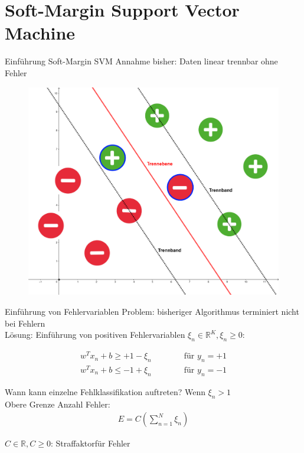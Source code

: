 \documentclass[ngerman]{beamer}
\begin{document}
\section{Soft-Margin Support Vector Machine}

\begin{frame}{Einführung Soft-Margin SVM}
	Annahme bisher: Daten linear trennbar ohne Fehler \\
	
	\begin{center}
		\begin{figure}
			\includegraphics[width=\textwidth,height=0.7\textheight,keepaspectratio]{assets/soft_margin_example.png}
		\end{figure}
	\end{center}
\end{frame}

\begin{frame}{Einführung von Fehlervariablen}
	Problem: bisheriger Algorithmus terminiert nicht bei Fehlern \\
	Lösung: Einführung von positiven Fehlervariablen $\xi_{n} \in \mathbb{R}^{K}, \xi_{n} \geq 0$:
	
	\begin{subequations}
		\begin{alignat*}{2}
			w^{T} x_{n} + b \geq +1 - \xi_{n}& \qquad & \text{ für } y_{n} = +1\\
			w^{T} x_{n} + b \leq -1 + \xi_{n}& & \text{ für } y_{n} = -1
		\end{alignat*}
	\end{subequations}

	Wann kann einzelne Fehlklassifikation auftreten? Wenn $\xi_{n} > 1$ \\
	
	Obere Grenze Anzahl Fehler:
	\begin{equation*}
		\begin{aligned}
			E = C(\sum_{n=1}^{N} \xi_{n})
		\end{aligned}
	\end{equation*}

	$C \in \mathbb{R}, C \geq 0$: \glqq Straffaktor\grqq für Fehler
\end{frame}
\end{document}
